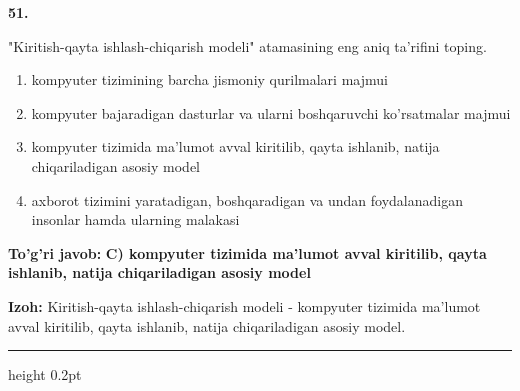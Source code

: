 \documentclass[10pt,a4paper,oneside]{article}
\begin{document}
\noindent\textbf{\color{ink}51.}
\par
"Kiritish-qayta ishlash-chiqarish modeli" atamasining eng aniq ta'rifini toping.
\begin{enumerate}[label=\Alph*),leftmargin=9mm]
\item kompyuter tizimining barcha jismoniy qurilmalari majmui
\item kompyuter bajaradigan dasturlar va ularni boshqaruvchi ko'rsatmalar majmui
\item kompyuter tizimida ma'lumot avval kiritilib, qayta ishlanib, natija chiqariladigan asosiy model
\item axborot tizimini yaratadigan, boshqaradigan va undan foydalanadigan insonlar hamda ularning malakasi
\end{enumerate}
\begin{tcolorbox}[enhanced,breakable,colback=teal!4,colframe=teal!50!black,boxrule=0.5pt,arc=1.1mm,left=3mm,right=3mm,top=1.7mm,bottom=1.7mm,before skip=2mm,after skip=2mm]
\textbf{\color{teal}To'g'ri javob:} \textbf{C) kompyuter tizimida ma'lumot avval kiritilib, qayta ishlanib, natija chiqariladigan asosiy model}
\par\smallskip
\textbf{Izoh:} Kiritish-qayta ishlash-chiqarish modeli - kompyuter tizimida ma'lumot avval kiritilib, qayta ishlanib, natija chiqariladigan asosiy model.
\end{tcolorbox}
\vspace{2mm}\hrule height 0.2pt \vspace{3mm}
\end{document}
